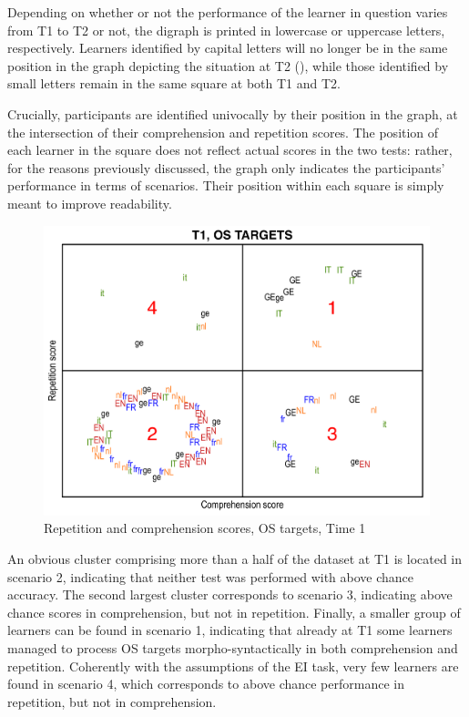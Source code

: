 Depending on whether or not the performance of the learner in question varies from T1 to T2 or not, the digraph is printed in lowercase or uppercase letters, respectively. Learners identified by capital letters will no longer be in the same position in the graph depicting the situation at T2 (), while those identified by small letters remain in the same square at both T1 and T2. 

Crucially, participants are identified univocally by their position in the graph, at the intersection of their comprehension and repetition scores. The position of each learner in the square does not reflect actual scores in the two tests: rather, for the reasons previously discussed, the graph only indicates the participants’ performance in terms of scenarios. Their position within each square is simply meant to improve readability. 

\begin{figure}
    \includegraphics[width=\textwidth]{figures/06-2.pdf}
    \caption{Repetition and comprehension scores, OS targets, Time 1}
    \label{fig:06:2}
\end{figure}

An obvious cluster comprising more than a half of the dataset at T1 is located in scenario 2, indicating that neither test was performed with above chance accuracy. The second largest cluster corresponds to scenario 3, indicating above chance scores in comprehension, but not in repetition. Finally, a smaller group of learners can be found in scenario 1, indicating that already at T1 some learners managed to process OS targets morpho-syntactically in both comprehension and repetition. Coherently with the assumptions of the EI task, very few learners are found in scenario 4, which corresponds to above chance performance in repetition, but not in comprehension.

